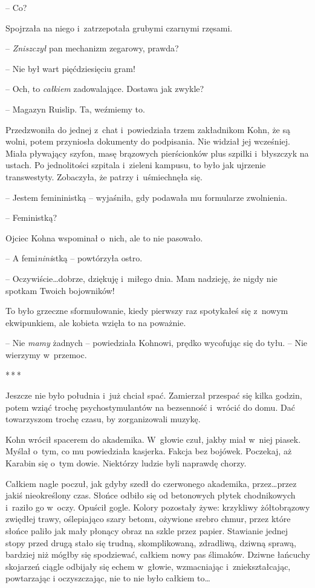 \documentclass[oneside,polish,11pt,sfheadings]{mwbk}
\newcommand{\threeast}{\bigskip\par\centerline{*\,*\,*}\medskip\par}%
\begin{document}
-- Co?

Spojrzała na niego i~zatrzepotała grubymi czarnymi rzęsami.

-- \emph{Zniszczył} pan mechanizm zegarowy, prawda?

-- Nie był wart pięćdziesięciu gram!

-- Och, to \emph{całkiem} zadowalające. Dostawa jak zwykle?

-- Magazyn Ruislip. Ta, weźmiemy to.

Przedzwoniła do jednej z~chat i~powiedziała trzem zakładnikom Kohn, że
są wolni, potem przyniosła dokumenty do podpisania. Nie widział jej
wcześniej. Miała pływający szyfon, masę brązowych pierścionków plus
szpilki i~błyszczyk na ustach. Po jednolitości szpitala i~zieleni
kampusu, to było jak ujrzenie transwestyty. Zobaczyła, że patrzy i~uśmiechnęła się.

-- Jestem femininistką -- wyjaśniła, gdy podawała mu formularze
zwolnienia.

-- Feministką?

Ojciec Kohna wspominał o~nich, ale to nie pasowało.

-- A femi\emph{nini}stką -- powtórzyła ostro.

-- Oczywiście\ldots dobrze, dziękuję i~miłego dnia. Mam nadzieję, że nigdy
nie spotkam Twoich bojowników!

To było grzeczne sformułowanie, kiedy pierwszy raz spotykałeś się z~nowym ekwipunkiem, ale kobieta wzięła to na poważnie.

-- Nie \emph{mamy} żadnych -- powiedziała Kohnowi, prędko wycofując się do
tyłu. -- Nie wierzymy w~przemoc.
  \threeast 

Jeszcze nie było południa i~już chciał spać. Zamierzał przespać się
kilka godzin, potem wziąć trochę psychostymulantów na bezsenność i~wrócić do domu. Dać towarzyszom trochę czasu, by zorganizowali muzykę.

Kohn wrócił spacerem do akademika. W~głowie czuł, jakby miał w~niej
piasek. Myślał o~tym, co mu powiedziała kasjerka. Fakcja bez bojówek.
Poczekaj, aż Karabin się o~tym dowie. Niektórzy ludzie byli naprawdę
chorzy.

Całkiem nagle poczuł, jak gdyby szedł do czerwonego akademika,
przez\ldots przez jakiś nieokreślony czas. Słońce odbiło się od betonowych
płytek chodnikowych i~raziło go w~oczy. Opuścił gogle. Kolory pozostały
żywe: krzykliwy żółtobrązowy zwiędłej trawy, oślepiająco szary betonu,
ożywione srebro chmur, przez które słońce paliło jak mały płonący obraz
na szkle przez papier. Stawianie jednej stopy przed drugą stało się
trudną, skomplikowaną, zdradliwą, dziwną sprawą, bardziej niż mógłby się
spodziewać, całkiem nowy pas ślimaków. Dziwne łańcuchy skojarzeń ciągle
odbijały się echem w~głowie, wzmacniając i~zniekształcając, powtarzając
i oczyszczając, nie to nie było całkiem to\ldots
\end{document}
